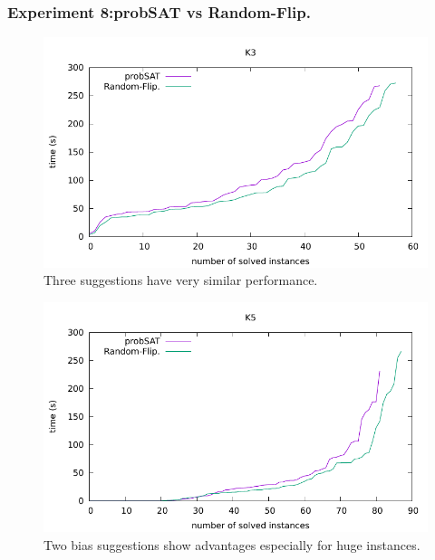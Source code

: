 \documentclass[12pt,a4paper,twoside]{scrartcl}
\numberwithin{equation}{section}
\begin{document}
\subsubsection{Experiment 8:probSAT vs Random-Flip.}  
  \begin{figure}[H]
\begin{center}
  \includegraphics[scale = 1]{DATA/K3/e4r.pdf}
  \end{center}
  \caption{Three suggestions have very similar performance.}
  \label{Experiment 6 k3-w cactus plot}
  \end{figure}
  \begin{figure}[H]
\begin{center}
  \includegraphics[scale = 1]{DATA/K5/e4r.pdf}
  \end{center}
  \caption{Two bias suggestions show advantages especially for huge instances.}
  \label{Experiment 6 k5-w cactus plot}
  \end{figure}
\end{document}
